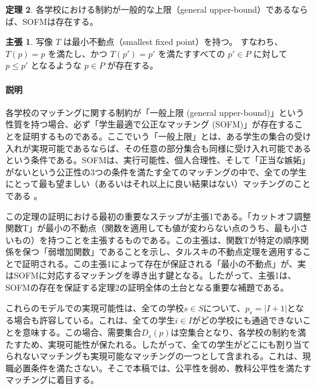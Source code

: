 \documentclass[12pt, a4paper]{article}
\theoremstyle{definition}
\theoremstyle{remark}
\theoremstyle{plain}
\begin{document}






\textbf{定理 2}. 
各学校における制約が一般的な上限（general upper-bound）であるならば、SOFMは存在する。

\textbf{主張 1}. 
写像 $T$ は最小不動点（smallest fixed point）を持つ。
すなわち、$T(p) = p$ を満たし、かつ $T(p') = p'$ を満たすすべての $p' \in P$ に対して $p \leq p'$ となるような $p \in P$ が存在する。

\paragraph{説明}
各学校のマッチングに関する制約が「一般上限 (general upper-bound)」という性質を持つ場合、必ず「学生最適で公正なマッチング (SOFM)」が存在することを証明するものである。ここでいう「一般上限」とは、ある学生の集合の受け入れが実現可能であるならば、その任意の部分集合も同様に受け入れ可能であるという条件である。SOFMは、実行可能性、個人合理性、そして「正当な嫉妬」がないという公正性の3つの条件を満たす全てのマッチングの中で、全ての学生にとって最も望ましい（あるいはそれ以上に良い結果はない）マッチングのことである 。

この定理の証明における最初の重要なステップが主張1である。「カットオフ調整関数T」が最小の不動点（関数を適用しても値が変わらない点のうち、最も小さいもの）を持つことを主張するものである。この主張は、関数Tが特定の順序関係を保つ「弱増加関数」であることを示し、タルスキの不動点定理を適用することで証明される。この主張1によって存在が保証される「最小の不動点」が、実はSOFMに対応するマッチングを導き出す鍵となる。したがって、主張1は、SOFMの存在を保証する定理2の証明全体の土台となる重要な補題である。
\bigbreak

これらのモデルでの実現可能性は、全ての学校$s \in S$について、$p_s = |I+1|$となる場合も許容している。これは、全ての学生$i \in I$がどの学校にも通過できないことを意味する。この場合、需要集合$D_s(p)$は空集合となり、各学校の制約を満たすため、実現可能性が保たれる。したがって、全ての学生がどこにも割り当てられないマッチングも実現可能なマッチングの一つとして含まれる。これは、現職必置条件を満たさない。そこで本稿では、公平性を弱め、教科公平性を満たすマッチングに着目する。
\end{document}
